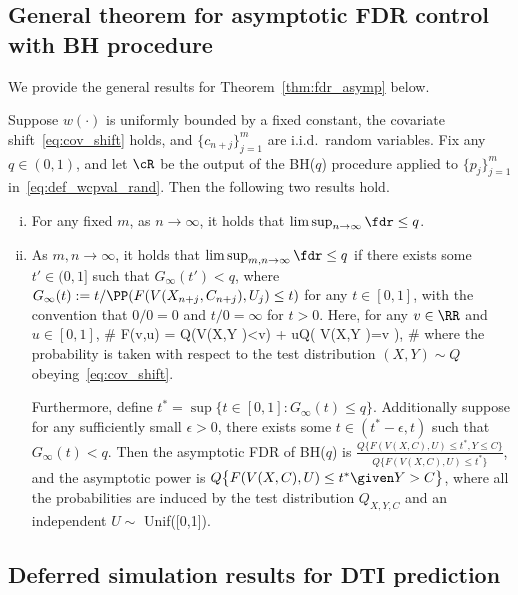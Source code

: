 \subsection{General theorem for asymptotic FDR control with BH procedure}
\label{app:fdr_asymp}

We provide the general results for Theorem~\ref{thm:fdr_asymp} below.
\begin{theorem}\label{thm:fdr_asymp_full}
  Suppose $w(\cdot)$ is uniformly bounded by a fixed constant, the covariate shift~\eqref{eq:cov_shift} holds,
  and $\{c_{n+j}\}_{j=1}^m$ are i.i.d.~random variables.
  Fix any $q\in(0,1)$,
  and let $\cR$ be the output of the BH($q$) procedure applied to
  $\{p_j\}_{j=1}^m$ in~\eqref{eq:def_wcpval_rand}.
  Then the following two results hold.
  \begin{enumerate}[(i)]
  \item For any fixed $m$, as $n\to \infty$,
  it holds   that $\limsup_{n\to \infty} \fdr \leq q$.
  \item As $m,n\to\infty$, it holds that $\limsup_{m,n\to \infty} \fdr \leq q$ if
  there exists some $t'\in(0,1]$ such that
  $G_\infty(t') <q$, where
  $
  G_\infty(t) :=    t /\PP ( F( V(X_{n+j},C_{n+j}) , U_j) \leq t  )
  $
  for any $t\in [0,1]$, with the convention that $0/0=0$ and $t/0=\infty$ for $t>0$.
  Here,
  for any $v\in \RR$ and $u\in[0,1]$,
  \#\label{eq:def_F}
  F(v,u) = Q\big(V(X,Y )<v\big) + u\cdot Q\big( V(X,Y )=v \big),
  \#
  where the probability is taken with respect to
  the test distribution $(X,Y)\sim Q$ obeying~\eqref{eq:cov_shift}.

  Furthermore, define $t^* = \sup\{t\in [0,1]\colon G_\infty(t) \leq q\}$.
  Additionally suppose for any sufficiently small $\epsilon>0$,
  there exists some $t\in(t^*-\epsilon,t)$ such that $G_\infty(t) < q$.
  Then the asymptotic FDR of BH($q$) is
  $\frac{ Q \{ F(V(X,C),U)\leq t^*, Y\leq C \}}{Q\{F(V(X,C),U)\leq t^* \} }$,
  and the asymptotic power is
  $Q \big\{ F(V(X,C),U)\leq t^*\given  Y  > C \big\} $,
  where all the probabilities are induced by the test distribution
  $Q_{X,Y ,C }$ and an independent $U\sim $ \rm{Unif([0,1])}.
  \end{enumerate}
  \end{theorem}


\subsection{Deferred simulation results for DTI prediction}
\label{app:subsec_dti}

